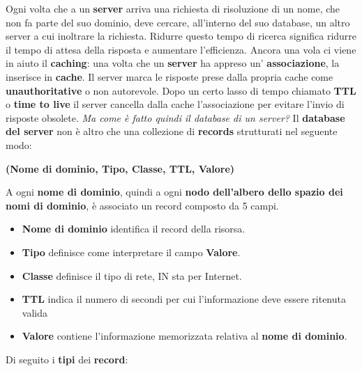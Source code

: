 \documentclass[11pt,a4paper]{article}
\theoremstyle{definition}
\begin{document}
Ogni volta che a un \textbf{server} arriva una richiesta di risoluzione di un nome, che non fa parte del suo dominio, deve cercare, all'interno del suo database, un altro server a cui inoltrare la richiesta. Ridurre questo tempo di ricerca significa ridurre il tempo di attesa della risposta e aumentare l'efficienza. Ancora una vola ci viene in aiuto il \textbf{caching}: una volta che un \textbf{server} ha appreso un' \textbf{associazione}, la inserisce in \textbf{cache}. Il server marca le risposte prese dalla propria cache come \textbf{unauthoritative} o non autorevole.
\newpage
Dopo un certo lasso di tempo chiamato \textbf{TTL} o \textbf{time to live} il server cancella dalla cache l'associazione per evitare l'invio di risposte obsolete.\newline\newline
\textit{Ma come è fatto quindi il database di un server?}\newline\newline
Il \textbf{database del server} non è altro che una collezione di \textbf{records} strutturati nel seguente modo:\newline\newline
\centerline{\textbf{(Nome di dominio, Tipo, Classe, TTL, Valore)}}\newline\newline
A ogni \textbf{nome di dominio}, quindi a ogni \textbf{nodo dell'albero dello spazio dei nomi di dominio}, è associato un record composto da 5 campi.
\begin{itemize}
	\item \textbf{Nome di dominio} identifica il record della risorsa.
	\item \textbf{Tipo} definisce come interpretare il campo \textbf{Valore}.
	\item \textbf{Classe} definisce il tipo di rete, IN sta per Internet.
	\item \textbf{TTL} indica il numero di secondi per cui l'informazione deve essere ritenuta valida
	\item \textbf{Valore} contiene l'informazione memorizzata relativa al \textbf{nome di dominio}.
\end{itemize}
Di seguito i \textbf{tipi} dei \textbf{record}:
\end{document}
